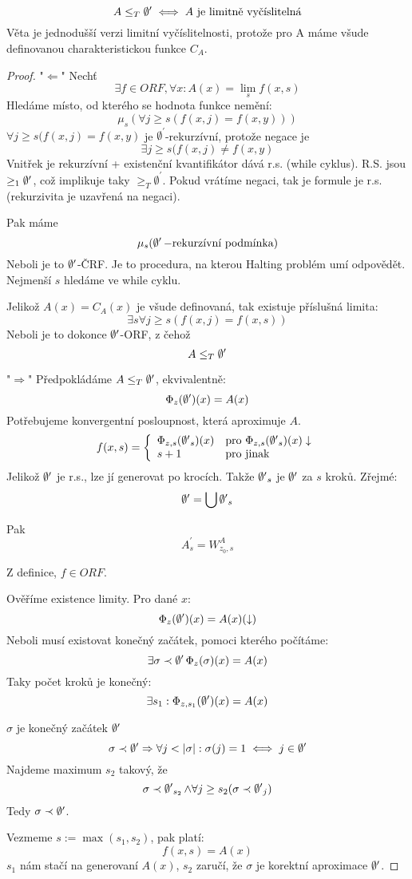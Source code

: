 \begin{theorem}\label{lim_comp}
	\[ A \leq_T \operatorname{\emptyset^{\prime}} \iff A\ \text{je limitně vyčíslitelná} \]
	Věta je jednodušší verzi limitní vyčíslitelnosti, protože pro A máme všude definovanou charakteristickou funkce $C_A$.
\end{theorem}
\begin{proof}
	"$\Leftarrow$" Nechť
	\[ \exists f \in ORF, \forall x: A(x) = \lim_s f(x, s) \]
	Hledáme místo, od kterého se hodnota funkce nemění:
	\[ \mu_s(\forall j \geq s(f(x, j) = f(x, y))) \]
	$\forall j \geq s(f(x, j) = f(x, y)$ je $\emptyset^{\prime}$-rekurzívní, protože negace je
	\[ \exists j \geq s(f(x, j) \neq f(x, y) \]
	Vnitřek je rekurzívní + existenční kvantifikátor dává r.s. (while cyklus).
	R.S. jsou $\geq_1 \operatorname{\emptyset^{\prime}}$, což implikuje taky $\geq_T \emptyset^{\prime}$.
	Pokud vrátíme negaci, tak je formule je r.s. (rekurzivita je uzavřená na negaci).

	Pak máme
	\[ \mu_s(\operatorname{\emptyset^{\prime}}-\text{rekurzívní podmínka}) \]
	Neboli je to $\operatorname{\emptyset^{\prime}}$-ČRF.
	Je to procedura, na kterou Halting problém umí odpovědět.
	Nejmenší $s$ hledáme ve while cyklu.

	Jelikož $A(x) = C_A(x)$ je všude definovaná, tak existuje příslušná limita:
	\[ \exists s \forall j \geq s(f(x, j) = f(x, s)) \]
	Neboli je to dokonce $\operatorname{\emptyset^{\prime}}$-ORF, z čehož
	\[ A \leq_T \operatorname{\emptyset^{\prime}} \]

	"$\Rightarrow$" Předpokládáme $A \leq_T \operatorname{\emptyset^{\prime}}$, ekvivalentně:
	\[ \Phi_z(\operatorname{\emptyset^{\prime}})(x) = A(x) \]
	Potřebujeme konvergentní posloupnost, která aproximuje $A$.
	\[ f(x, s) = \left\{ \begin{array}{ll} \Phi_{z, s}(\operatorname{\emptyset^{\prime}}_s)(x) & \mbox{pro } \Phi_{z, s}(\operatorname{\emptyset^{\prime}}_s)(x) \downarrow \\ s + 1 & \mbox{pro } \text{jinak} \end{array} \right. \]
	Jelikož $\operatorname{\emptyset^{\prime}}$ je r.s., lze jí generovat po krocích.
	Takže $\operatorname{\emptyset^{\prime}}_s$ je $\operatorname{\emptyset^{\prime}}$ za $s$ kroků.
	Zřejmé:
	\[ \operatorname{\emptyset^{\prime}} = \bigcup \operatorname{\emptyset^{\prime}}_s \]

	Pak
	\[ A_s^{\prime} = W_{z_0, s}^A \]

	Z definice, $f \in ORF$.

	Ověříme existence limity.
	Pro dané $x$:
	\[ \Phi_{z}(\operatorname{\emptyset^{\prime}})(x) = A(x) (\downarrow) \]
	Neboli musí existovat konečný začátek, pomoci kterého počítáme:
	\[ \exists \sigma \prec \operatorname{\emptyset^{\prime}} \Phi_{z}(\sigma)(x) = A(x)\]
	Taky počet kroků je konečný:
	\[ \exists s_1: \Phi_{z, s_1}(\operatorname{\emptyset^{\prime}})(x) = A(x) \]

	$\sigma$ je konečný začátek $\operatorname{\emptyset^{\prime}}$
	\[ \sigma \prec \operatorname{\emptyset^{\prime}} \Rightarrow \forall j < |\sigma|: \sigma(j) = 1 \iff j \in \operatorname{\emptyset^{\prime}} \]
	Najdeme maximum $s_2$ takový, že
	\[ \sigma \prec \operatorname{\emptyset^{\prime}}_{s_2} \land \forall j \geq s_2 (\sigma \prec \operatorname{\emptyset^{\prime}}_j) \]
	Tedy $\sigma \prec \operatorname{\emptyset^{\prime}}$.

	Vezmeme $s:= \max(s_1, s_2)$, pak platí:
	\[ f(x, s) = A(x) \]
	$s_1$ nám stačí na generovaní $A(x)$, $s_2$ zaručí, že $\sigma$ je korektní aproximace $\operatorname{\emptyset^{\prime}}$.
\end{proof}

